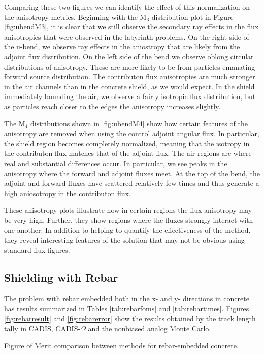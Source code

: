 Comparing these two figures we can identify the effect
of this normalization on the anisotropy metrics. Beginning with the M$_3$
distribution plot in Figure \ref{fig:ubendM3}, it is clear that we still observe
the secondary ray effects in the flux anisotropies that were observed in the
labyrinth problems. On the right side of the u-bend, we observe ray effects in
the aniostropy that are likely from the adjoint flux distribution. On the left
side of the bend we observe oblong circular distributions of anisotropy. These
are more likely to be from particles emanating forward source distribution. The
contributon flux anisotropies are much stronger in the air channels than in the
concrete shield, as we would expect. In the shield immediately bounding the air,
we observe a fairly isotropic flux distribution, but as particles reach closer
to the edges the anisotropy increases slightly.

The M$_4$ distributions shown in \ref{fig:ubendM4} show how certain features of
the anisotropy are removed when using the control adjoint angular flux. In
particular, the shield region becomes completely normalized, meaning that the
isotropy in the contributon flux matches that of the adjoint flux. The air
regions are where real and substantial differences occur. In particular, we see
peaks in the anisotropy where the forward and adjoint fluxes meet. At the top of
the bend, the adjoint and forward fluxes have scattered relatively few times and
thus generate a high aniosotropy in the contributon flux.

These anisotropy plots illustrate how in certain regions the flux anisotropy may
be very high. Further, they show regions where the fluxes strongly interact with
one another. In addition to helping to quantify the effectiveness of the method,
they reveal interesting features of the solution that may not be obvious using
standard flux figures.

\subsection{Shielding with Rebar}
\label{subsec:resultrebar}

The problem with rebar embedded both in the x- and y- directions
in concrete has
results summarized in Tables
\ref{tab:rebarfoms} and \ref{tab:rebartimes}. Figures
\ref{fig:rebarresult} and \ref{fig:rebarerror} show the results obtained
by the track length tally in CADIS, CADIS-$\Omega$ and the nonbiased analog
Monte Carlo.

\begin{table}[h!]
  \centering
  
  \caption[Figure of Merit comparison between methods for rebar-embedded
  concrete.]{Figure of Merit comparison between methods for rebar-embedded
  concrete.}
  \label{tab:rebarfoms}
\end{table}

